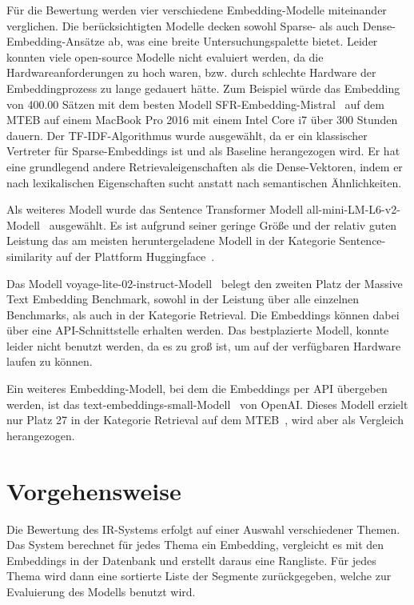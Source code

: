 Für die Bewertung werden vier verschiedene Embedding-Modelle miteinander verglichen.
Die berücksichtigten Modelle decken sowohl Sparse- als auch Dense-Embedding-Ansätze ab, was eine breite Untersuchungspalette bietet.
Leider konnten viele open-source Modelle nicht evaluiert werden, da die Hardwareanforderungen zu hoch waren, bzw. durch schlechte Hardware der Embeddingprozess zu lange gedauert hätte. 
Zum Beispiel würde das Embedding von 400.00 Sätzen mit dem besten Modell SFR-Embedding-Mistral~\cite{zotero-576} auf dem MTEB auf einem MacBook Pro 2016 mit einem Intel Core i7 über 300 Stunden dauern.
Der TF-IDF-Algorithmus wurde ausgewählt, da er ein klassischer Vertreter für Sparse-Embeddings ist und als Baseline herangezogen wird. 
Er hat eine grundlegend andere Retrievaleigenschaften als die Dense-Vektoren, indem er nach lexikalischen Eigenschaften sucht anstatt nach semantischen Ähnlichkeiten.


Als weiteres Modell wurde das Sentence Transformer Modell all-mini-LM-L6-v2-Modell~\cite{minilm2024} ausgewählt.
Es ist aufgrund seiner geringe Größe und der relativ guten Leistung das am meisten heruntergeladene Modell in der Kategorie Sentence-similarity auf der Plattform Huggingface~\cite{2024}.

Das Modell voyage-lite-02-instruct-Modell~\cite{zotero-572} belegt den zweiten Platz der Massive Text Embedding Benchmark, sowohl in der Leistung über alle einzelnen Benchmarks, als auch in der Kategorie Retrieval.
Die Embeddings können dabei über eine API-Schnittstelle erhalten werden.
Das bestplazierte Modell, konnte leider nicht benutzt werden, da es zu groß ist, um auf der verfügbaren Hardware laufen zu können.


Ein weiteres Embedding-Modell, bei dem die Embeddings per API übergeben werden, ist das text-embeddings-small-Modell~\cite{zotero-574} von OpenAI.
Dieses Modell erzielt nur Platz 27 in der Kategorie Retrieval auf dem MTEB~\cite{mteb}, wird aber als Vergleich herangezogen.


\section{Vorgehensweise}
Die Bewertung des IR-Systems erfolgt auf einer Auswahl verschiedener Themen. 
Das System berechnet für jedes Thema ein Embedding, vergleicht es mit den Embeddings in der Datenbank und erstellt daraus eine Rangliste. 
Für jedes Thema wird dann eine sortierte Liste der Segmente zurückgegeben, welche zur Evaluierung des Modells benutzt wird.


